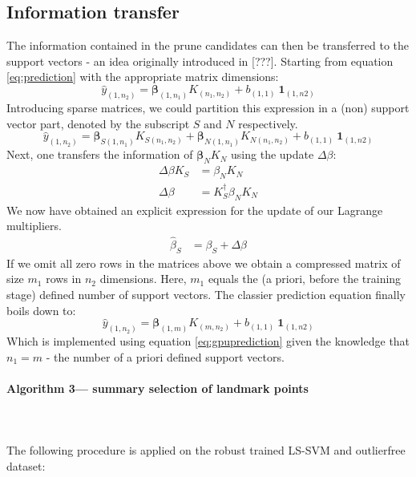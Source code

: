 \documentclass[preprint,12pt]{elsarticle}
\begin{document}
\subsection{Information transfer}
 The information contained in the prune candidates can then be transferred to the support vectors - an idea originally introduced in [???]. Starting from equation \ref{eq:prediction} with the appropriate matrix dimensions:
\begin{equation}
\hat{y}_{(1,n_2) } = \mathbf{\beta}_{(1,n_1)} K_{(n_1, n_2)} + b_{(1,1)} \ \mathbf{1}_{(1, n2)} 
\end{equation}
Introducing sparse matrices, we could partition this expression in a (non) support vector part, denoted by the subscript $S$ and $N$ respectively.
\begin{equation}
\hat{y}_{(1,n_2) } = \mathbf{\beta}_{S(1,n_1)} K_{S(n_1, n_2)} + \mathbf{\beta}_{N(1,n_1)} K_{N(n_1, n_2)} + b_{(1,1)} \ \mathbf{1}_{(1, n2)}
\end{equation}
Next, one transfers the information of $\mathbf{\beta}_{N} K_{N}$ using the update $\Delta\beta$: 
\begin{align}
\Delta \beta K_S &= \beta_N K_N  \\
\Delta \beta &= K^\dagger_S  \beta_N K_N
\end{align}
We now have obtained an explicit expression for the update of our Lagrange multipliers. 
\begin{align}
\hat{\beta}_S &= \beta_S + \Delta\beta
\end{align}
If we omit all zero rows in the matrices above we obtain a compressed matrix of size $m_1$ rows in $n_2$ dimensions. Here, $m_1$ equals the (a priori, before the training stage) defined number of support vectors. The classier prediction equation finally boils down to:
\begin{equation}
\hat{y}_{(1,n_2) } = \mathbf{\beta}_{(1,m)} K_{(m, n_2)} + b_{(1,1)} \ \mathbf{1}_{(1, n2)} 
\end{equation}
Which is implemented using equation \ref{eq:gpuprediction} given the knowledge that $n_1 = m$ - the number of a priori defined support vectors. \\

\paragraph{Algorithm 3--- summary selection of landmark points} 
\hfill \\\\
The following procedure is applied on the robust trained LS-SVM and outlierfree dataset:
\end{document}

